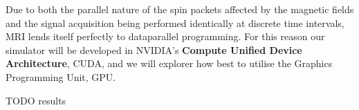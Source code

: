 
Due to both the parallel nature of the spin packets affected by the
magnetic fields and the signal acquisition being performed identically
at discrete time intervals, MRI lends itself perfectly to dataparallel
programming. For this reason our simulator will be developed in
NVIDIA's \textbf{Compute Unified Device Architecture}, CUDA, and we
will explorer how best to utilise the Graphics Programming Unit, GPU.

TODO results

